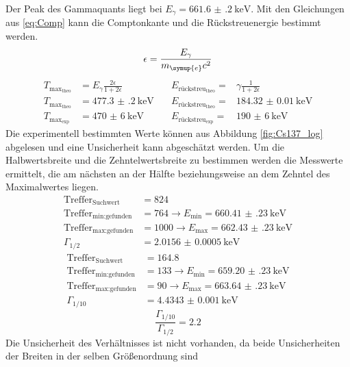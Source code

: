 \FloatBarrier
Der Peak des Gammaquants liegt bei $E_{\gamma}=\SI{661.6(2)}{\kilo\eV}$. Mit den Gleichungen aus \eqref{eq:Comp} kann 
die Comptonkante und die Rückstreuenergie bestimmt werden.
\begin{equation*}
  \epsilon = \frac{E_{\gamma}}{m_{\symup{e}}c^2}
\end{equation*}
\begin{align}
  T_{\text{max}_{\text{theo}}} &= E_{\gamma}\frac{2\epsilon}{1+2\epsilon} \quad &E_{\text{rückstreu}_{\text{theo}}} =&{\gamma}\frac{1}{1+2\epsilon} \label{eq:Comp}\\
  T_{\text{max}_{\text{theo}}} &= \SI{477.3(2)}{\kilo\eV} \quad &E_{\text{rückstreu}_{\text{theo}}} =& \SI{184.32(1)}{\kilo\eV}\\
  T_{\text{max}_{\text{exp}}} &= \SI{470(6)}{\kilo\eV} \quad & E_{\text{rückstreu}_{\text{exp}}} =& \SI{190(6)}{\kilo\eV}
\end{align}
Die experimentell bestimmten Werte können aus Abbildung \ref{fig:Cs137_log} abgelesen und eine Unsicherheit 
kann abgeschätzt werden.
Um die Halbwertsbreite und die Zehntelwertsbreite zu bestimmen werden die Messwerte ermittelt, die am nächsten an der 
Hälfte beziehungsweise an dem Zehntel des Maximalwertes liegen.
\begin{align*}
  \text{Treffer}_{\text{Suchwert}}&=824\\
  \text{Treffer}_{\text{min:gefunden}} &= 764 \rightarrow E_{\text{min}} = \SI{660.41(23)}{\kilo\eV}\\
  \text{Treffer}_\text{{max:gefunden}} &= 1000 \rightarrow E_{\text{max}} = \SI{662.43(23)}{\kilo\eV}\\
  \Gamma_{1/2} &= \SI{2.0156(5)}{\kilo\eV}
\end{align*}
\begin{align*}
  \text{Treffer}_{\text{Suchwert}}&=\num{164.8}\\
  \text{Treffer}_{\text{min:gefunden}} &= 133 \rightarrow E_{\text{min}} = \SI{659.20(23)}{\kilo\eV}\\
  \text{Treffer}_{\text{max:gefunden}} &= 90  \rightarrow E_{\text{max}} = \SI{663.64(23)}{\kilo\eV}\\
  \Gamma_{1/10} &= \SI{4.4343(10)}{\kilo\eV}
\end{align*}
\begin{equation*}
  \frac{\Gamma_{1/10}}{\Gamma_{1/2}}=\num{2.2}
\end{equation*}
Die Unsicherheit des Verhältnisses ist nicht vorhanden, da beide Unsicherheiten der Breiten in der selben Größenordnung sind 
